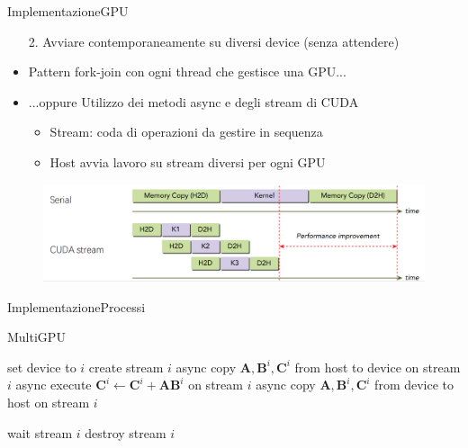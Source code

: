 \documentclass{beamer}
\begin{document}
\begin{frame}{Implementazione}{GPU}
    \begin{enumerate}
        \item[2.] Avviare contemporaneamente su diversi device (senza attendere)
    \end{enumerate}
    \medskip

    \begin{itemize}
        \item Pattern fork-join con ogni thread che gestisce una GPU...
        \item ...oppure \alert{Utilizzo dei metodi async e degli stream di CUDA}
              \begin{itemize}
                  \item Stream: coda di operazioni da gestire in sequenza
                  \item Host avvia lavoro su stream diversi per ogni GPU
              \end{itemize}
    \end{itemize}

    \begin{figure}[h]
        \includegraphics[width=0.8\linewidth]{imgs/cuda_stream.png}
    \end{figure}
\end{frame}

\begin{frame}{Implementazione}{Processi}
    \begin{algorithm}[H]
        \caption{MultiGPU}
        \begin{algorithmic}
            \State set device to $i$
            \State create stream $i$
            \State async copy $\mathbf{A}, \mathbf{B}^i, \mathbf{C}^i$ from host to device on stream $i$
            \State async execute $\mathbf{C}^{i} \gets \mathbf{C}^{i} + \mathbf{A}\mathbf{B}^{i}$ on stream $i$
            \State async copy $\mathbf{A}, \mathbf{B}^i, \mathbf{C}^i$ from device to host on stream $i$
            \EndFor

            \State wait stream $i$
            \State destroy stream $i$
            \EndFor
        \end{algorithmic}
    \end{algorithm}
\end{frame}
\end{document}
